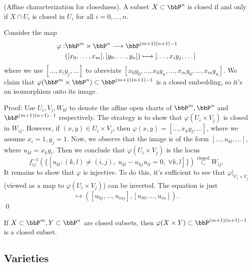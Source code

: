 \begin{dang}
    \begin{lemma}
        (Affine characterization for closedness). A subset $X\subset\bbP^n$ is closed if and only if 
        $X\cap U_i$ is closed in $U_i$ for all $i=0,\dots,n$.
    \end{lemma}
\end{dang}

\begin{dang}
    \begin{lemma}
        Consider the map 
        \begin{equation}
            \begin{split}
                 \varphi:&\bbP^{m}\times \bbP^n\longrightarrow\bbP^{(m+1)(n+1)-1}\\
                 &([x_0,\dots, x_m],[y_0,\dots,y_n])\longmapsto [\dots,x_iy_j,\dots]
            \end{split}
        \end{equation}
        where we use $[\dots,x_iy_j,\dots]$ to abreviate $[x_0y_0,\dots, x_0y_n,\dots, x_my_0,\dots, x_my_n]$. 
        We claim that $\varphi(\bbP^m\times\bbP^n)\subset\bbP^{(m+1)(n+1)-1}$ is a closed embedding, so it's 
        an isomorphism onto its image.
    \end{lemma}
\end{dang}
Proof: Use $U_i,V_j, W_{kl}$ to denote the affine open charts of 
$\bbP^{m},\bbP^n$ and $\bbP^{(m+1)(n+1)-1}$ respectively. The strategy is to show that 
$\varphi(U_i\times V_j)$ is closed in $W_{ij}$. However, if $(x,y)\in U_i\times V_j$, then 
$\varphi(x,y)=[\dots,x_ky_l,\dots]$, where we assume $x_i=1,y_j=1$. Now, we observe that the image is of the form 
$[\dots,u_{kl},\dots]$, where $u_{kl}=x_ky_l$. Then we conclude that $\varphi(U_i\times V_j)$ is the locus 
\begin{equation}
   f_{ij}^{-1}( \{[u_{kl}:(k,l)\neq(i,j),\;u_{kl}-u_{kj}u_{il}=0,\;\forall k,l]\}) \overset{\text{closed}}{\subset}W_{ij}.
\end{equation}
It remains to show that 
$\varphi$ is injective. To do this, it's sufficient to see that $\varphi|_{U_i\times V_j}$ 
(viewed as a map to $\varphi(U_i\times V_j)$) can be inverted. The equation is just 
\begin{equation}
    [\dots, u_{kl},\dots]\mapsto ([u_{0j},\dots, u_{mj}],[u_{i0},\dots, u_{in}]).
\end{equation}
\qed
\begin{dang}
    \begin{corollary}
        If $X\subset \bbP^m, Y\subset\bbP^n$ are closed subsets, then $\varphi(X\times Y)\subset\bbP^{(m+1)(n+1)-1}$
        is a closed subset.
    \end{corollary}
\end{dang}

\subsection{Varieties}
